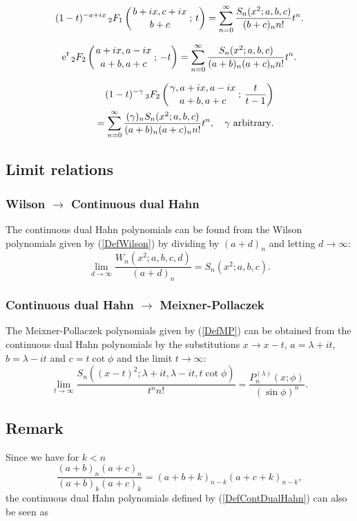 \documentclass[envcountchap,graybox]{svmono}
\newcounter{rom}
\newcommand{\hyp}[5]{\mbox{}_{#1}{F}_{#2}
\left(\genfrac{}{}{0pt}{}{#3}{#4}\,;\,#5\right)}
\newcommand{\e}{\textrm{e}}
\begin{document}
\begin{equation}
\label{GenContDualHahn3}
(1-t)^{-a+ix}\,\hyp{2}{1}{b+ix,c+ix}{b+c}{t}
=\sum_{n=0}^{\infty}\frac{S_n(x^2;a,b,c)}{(b+c)_nn!}t^n.
\end{equation}

\begin{equation}
\label{GenContDualHahn4}
\e^t\,\hyp{2}{2}{a+ix,a-ix}{a+b,a+c}{-t}=\sum_{n=0}^{\infty}
\frac{S_n(x^2;a,b,c)}{(a+b)_n(a+c)_nn!}t^n.
\end{equation}

\begin{eqnarray}
\label{GenContDualHahn5}
& &(1-t)^{-\gamma}\,\hyp{3}{2}{\gamma,a+ix,a-ix}{a+b,a+c}{\frac{t}{t-1}}\nonumber\\
& &{}=\sum_{n=0}^{\infty}\frac{(\gamma)_nS_n(x^2;a,b,c)}{(a+b)_n(a+c)_nn!}t^n,
\quad\textrm{$\gamma$ arbitrary}.
\end{eqnarray}

\subsection*{Limit relations}

\subsubsection*{Wilson $\rightarrow$ Continuous dual Hahn}
The continuous dual Hahn polynomials can be found from the Wilson polynomials
given by (\ref{DefWilson}) by dividing by $(a+d)_n$ and letting $d\rightarrow\infty$:
$$\lim_{d\rightarrow\infty}\frac{W_n(x^2;a,b,c,d)}{(a+d)_n}=S_n(x^2;a,b,c).$$

\subsubsection*{Continuous dual Hahn $\rightarrow$ Meixner-Pollaczek}
The Meixner-Pollaczek polynomials given by (\ref{DefMP}) can be obtained from the continuous
dual Hahn polynomials by the substitutions $x\rightarrow x-t$, $a=\lambda+it$, $b=\lambda-it$
and $c=t\cot\phi$ and the limit $t\rightarrow\infty$:
\begin{equation}
\lim_{t\rightarrow\infty}\frac{S_n((x-t)^2;\lambda+it,\lambda-it,t\cot\phi)}{t^nn!}
=\frac{P_n^{(\lambda)}(x;\phi)}{(\sin\phi)^n}.
\end{equation}

\subsection*{Remark}
Since we have for $k<n$
$$\frac{(a+b)_n(a+c)_n}{(a+b)_k(a+c)_k}=(a+b+k)_{n-k}(a+c+k)_{n-k},$$
the continuous dual Hahn polynomials defined by (\ref{DefContDualHahn}) can also be seen as
\end{document}
